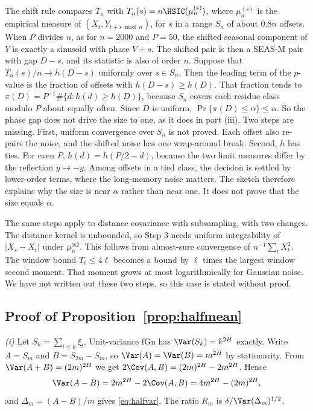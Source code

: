 \begin{remark}\label{rem:shift}
The shift rule compares $T_n$ with $T_n(s)=n\HSIC(\mu_n^{(s)})$, where $\mu_n^{(s)}$ is the empirical measure of $(X_t,Y_{t+s\bmod n})$, for $s$ in a range $S_n$ of about $0.8n$ offsets. When $P$ divides $n$, as for $n=2000$ and $P=50$, the shifted seasonal component of $Y$ is exactly a sinusoid with phase $V+s$. The shifted pair is then a SEAS-M pair with gap $D-s$, and its statistic is also of order $n$. Suppose that $T_n(s)/n\to h(D-s)$ uniformly over $s\in S_n$. Then the leading term of the $p$-value is the fraction of offsets with $h(D-s)\ge h(D)$. That fraction tends to $\pi(D)=P^{-1}\#\{d:h(d)\ge h(D)\}$, because $S_n$ covers each residue class modulo $P$ about equally often. Since $D$ is uniform, $\Pr\{\pi(D)\le\alpha\}\le\alpha$. So the phase gap does not drive the size to one, as it does in part (iii). Two steps are missing. First, uniform convergence over $S_n$ is not proved. Each offset also re-pairs the noise, and the shifted noise has one wrap-around break. Second, $h$ has ties. For even $P$, $h(d)=h(P/2-d)$, because the two limit measures differ by the reflection $y\mapsto-y$. Among offsets in a tied class, the decision is settled by lower-order terms, where the long-memory noise matters. The sketch therefore explains why the size is near $\alpha$ rather than near one. It does not prove that the size equals $\alpha$.
\end{remark}

\begin{remark}
The same steps apply to distance covariance with subsampling, with two changes. The distance kernel is unbounded, so Step 3 needs uniform integrability of $|X_s-X_t|$ under $\mu_n^{\otimes2}$. This follows from almost-sure convergence of $n^{-1}\sum_tX_t^2$. The window bound $T_\ell\le4\ell$ becomes a bound by $\ell$ times the largest window second moment. That moment grows at most logarithmically for Gaussian noise. We have not written out these two steps, so this case is stated without proof.
\end{remark}

\subsection{Proof of Proposition~\ref{prop:halfmean}}
\emph{(i)} Let $S_k=\sum_{t\le k}\xi_t$. Unit-variance fGn has $\Var(S_k)=k^{2H}$ exactly. Write $A=S_m$ and $B=S_{2m}-S_m$, so $\Var(A)=\Var(B)=m^{2H}$ by stationarity. From $\Var(A+B)=(2m)^{2H}$ we get $2\Cov(A,B)=(2m)^{2H}-2m^{2H}$. Hence
\[
\Var(A-B)=2m^{2H}-2\Cov(A,B)=4m^{2H}-(2m)^{2H},
\]
and $\Delta_m=(A-B)/m$ gives \eqref{eq:halfvar}. The ratio $R_m$ is $\delta/\Var(\Delta_m)^{1/2}$.

